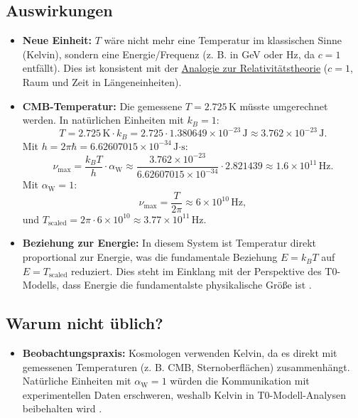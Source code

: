 \documentclass[12pt,a4paper]{article}
\newcommand{\alphaW}{\alpha_{\text{W}}}
\begin{document}
	\subsection{Auswirkungen}
    \begin{tcolorbox}[colback=blue!5!white,colframe=blue!75!black,title={Auswirkungen von $\alphaW = 1$}]		
	\begin{itemize}
			\item \textbf{Neue Einheit:} \(T\) wäre nicht mehr eine Temperatur im klassischen Sinne (Kelvin), sondern eine Energie/Frequenz (z. B. in GeV oder Hz, da \(c = 1\) entfällt). Dies ist konsistent mit der \href{https://github.com/jpascher/T0-Time-Mass-Duality/tree/main/2/pdf/Deutsch/Eine neue Perspektive auf Zeit und Raum Johann Paschers revolutionäre Ideen_de.pdf}{Analogie zur Relativitätstheorie} (\(c = 1\), Raum und Zeit in Längeneinheiten).
			\item \textbf{CMB-Temperatur:} Die gemessene \(T = 2.725 \, \text{K}\) müsste umgerechnet werden. In natürlichen Einheiten mit \(k_B = 1\):
			\[
			T = 2.725 \, \text{K} \cdot k_B = 2.725 \cdot 1.380649 \times 10^{-23} \, \text{J} \approx 3.762 \times 10^{-23} \, \text{J}.
			\]
			Mit \(h = 2\pi \hbar = 6.62607015 \times 10^{-34} \, \text{J·s}\):
			\[
			\nu_{\text{max}} = \frac{k_B T}{h} \cdot \alphaW \approx \frac{3.762 \times 10^{-23}}{6.62607015 \times 10^{-34}} \cdot 2.821439 \approx 1.6 \times 10^{11} \, \text{Hz}.
			\]
			Mit \(\alphaW = 1\):
			\[
			\nu_{\text{max}} = \frac{T}{2\pi} \approx 6 \times 10^{10} \, \text{Hz},
			\]
			und \(T_{\text{scaled}} = 2\pi \cdot 6 \times 10^{10} \approx 3.77 \times 10^{11} \, \text{Hz}\).
			\item \textbf{Beziehung zur Energie:} In diesem System ist Temperatur direkt proportional zur Energie, was die fundamentale Beziehung \(E = k_B T\) auf \(E = T_{\text{scaled}}\) reduziert. Dies steht im Einklang mit der Perspektive des T0-Modells, dass Energie die fundamentalste physikalische Größe ist \cite{pascher_alpha_2025}.
		\end{itemize}
	\end{tcolorbox}
	
	\subsection{Warum nicht üblich?}
	
	\begin{itemize}
		\item \textbf{Beobachtungspraxis:} Kosmologen verwenden Kelvin, da es direkt mit gemessenen Temperaturen (z. B. CMB, Sternoberflächen) zusammenhängt. Natürliche Einheiten mit \(\alphaW = 1\) würden die Kommunikation mit experimentellen Daten erschweren, weshalb Kelvin in T0-Modell-Analysen beibehalten wird \cite{pascher_messdifferenzen_2025}.
	\end{itemize}
	
\end{document}
